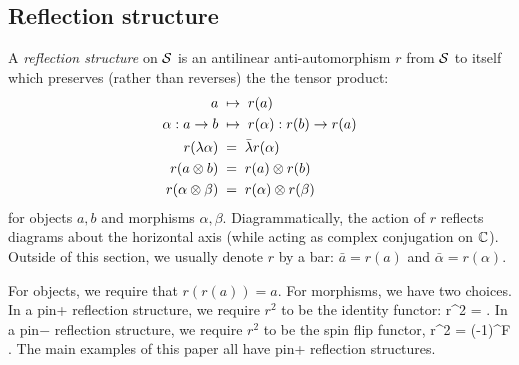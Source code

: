 \subsection{Reflection structure} \label{reflection_ss}

A {\it reflection structure} on $\mathcal{S}$ is an antilinear anti-automorphism $r$ from $\mathcal{S}$ to itself which preserves (rather than reverses) 
the the tensor product:
\begin{align}
	a & \; \mapsto \; r(a) \\
	\alpha: a\to b & \; \mapsto \; r(\alpha): r(b) \to r(a) \\
	r(\lambda \alpha) & \;=\;  \bar\lambda r(\alpha) \\
	r(a\otimes b) & \;=\;  r(a) \otimes r(b) \\
	r(\alpha\otimes \beta) & \;=\;  r(\alpha) \otimes r(\beta)
\end{align}
for objects $a,b$ and morphisms $\alpha,\beta$.  Diagrammatically, the action of  $r$ 
reflects diagrams about the horizontal axis (while acting as complex conjugation on $\mathbb{C}$). 
Outside of this section, we usually denote $r$ by a bar: $\bar a = r(a)$ and $\bar\alpha = r(\alpha)$.

For objects, we require that $r(r(a)) = a$.
For morphisms, we have two choices.
In a pin+ reflection structure, we require $r^2$ to be the identity functor:
\be
	r^2 = \id .
\ee
In a pin$-$ reflection structure, we require $r^2$ to be the spin flip functor,
\be
	r^2 = (-1)^F .
\ee
The main examples of this paper all have pin+ reflection structures.

